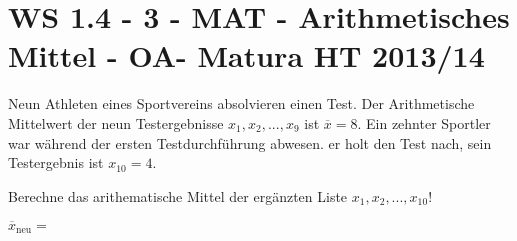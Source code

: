 \section{WS 1.4 - 3 - MAT - Arithmetisches Mittel - OA- Matura HT 2013/14}

\begin{beispiel}[WS 1.4]{1} %
				Neun Athleten eines Sportvereins absolvieren einen Test. Der Arithmetische Mittelwert der neun Testergebnisse $x_1,x_2,...,x_9$ ist $\overline{x}=8$. Ein zehnter Sportler war während der ersten Testdurchführung abwesen. er holt den Test nach, sein Testergebnis ist $x_{10}=4$.
				
				Berechne das arithematische Mittel der ergänzten Liste $x_1,x_2,...,x_{10}$!\leer
				
				$\overline{x}_\text{neu}=$ 
\end{beispiel}